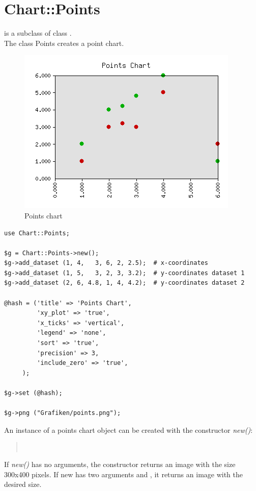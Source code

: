 %
%
\section{Chart::Points}
\begin{Description} 
 is a subclass of class .\\
The class Points creates a point chart.
\end{Description}


\begin{figure}[h]
	\begin{center}
		\includegraphics[scale=0.5]{points.png}
	\end{center}
	\caption{Points chart}
	\label{fig:points}
\end{figure}
\begin{verbatim}
use Chart::Points;

$g = Chart::Points->new();
$g->add_dataset (1, 4,   3, 6, 2, 2.5);  # x-coordinates
$g->add_dataset (1, 5,   3, 2, 3, 3.2);  # y-coordinates dataset 1
$g->add_dataset (2, 6, 4.8, 1, 4, 4.2);  # y-coordinates dataset 2

@hash = ('title' => 'Points Chart',
         'xy_plot' => 'true',
         'x_ticks' => 'vertical',
         'legend' => 'none',
         'sort' => 'true',
         'precision' => 3,
         'include_zero' => 'true',
	 );

$g->set (@hash);

$g->png ("Grafiken/points.png");
\end{verbatim}

\begin{Constructor} 
An instance of a points chart object can be created with the constructor \textit{new()}:
\begin{quote}
\\
\end{quote}

If \textit{new()} has no arguments, 
the constructor returns an image with the size 300x400 pixels. If new has two arguments 
 and , 
it returns an image with the desired size.
\end{Constructor}

